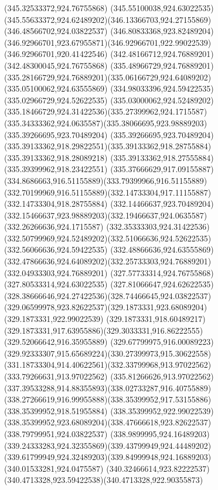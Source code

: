 {{		\lineto(345.32533372,924.76755868)
		\lineto(345.55100038,924.63022535)
		\curveto(345.55633372,924.62489202)(346.13366703,924.27155869)(346.48566702,924.03822537)
		\curveto(346.80833368,923.82489204)(346.92966701,923.67955871)(346.92966701,922.99022539)
		\lineto(346.92966701,920.41422546)
		\lineto(342.48166712,924.76889201)
		\lineto(342.48300045,924.76755868)
		\lineto(335.48966729,924.76889201)
		\curveto(335.28166729,924.76889201)(335.06166729,924.64089202)(335.05100062,924.63555869)
		\lineto(334.98033396,924.59422535)
		\lineto(335.02966729,924.52622535)
		\curveto(335.03000062,924.52489202)(335.18466729,924.31422536)(335.27399962,924.1715587)
		\curveto(335.34333362,924.0635587)(335.38066695,923.98889203)(335.39266695,923.70489204)
		\curveto(335.39266695,923.70489204)(335.39133362,918.29822551)(335.39133362,918.28755884)
		\lineto(335.39133362,918.28089218)
		\lineto(335.39133362,918.27555884)
		\lineto(335.39399962,918.23422551)
		\curveto(335.37666629,917.09155887)(334.8686663,916.51155889)(333.79399966,916.51155889)
		\curveto(332.70199969,916.51155889)(332.14733304,917.11155887)(332.14733304,918.28755884)
		\lineto(332.14466637,923.70489204)
		\curveto(332.15466637,923.98889203)(332.19466637,924.0635587)(332.26266636,924.1715587)
		\curveto(332.35333303,924.31422536)(332.50799969,924.52489202)(332.51066636,924.52622535)
		\lineto(332.56066636,924.59422535)
		\lineto(332.48866636,924.63555869)
		\curveto(332.47866636,924.64089202)(332.25733303,924.76889201)(332.04933303,924.76889201)
		\lineto(327.57733314,924.76755868)
		\lineto(327.80533314,924.63022535)
		\curveto(327.81066647,924.62622535)(328.38666646,924.27422536)(328.74466645,924.03822537)
		\curveto(329.06599978,923.82622537)(329.1873331,923.68089204)(329.1873331,922.99022539)
		\lineto(329.1873331,918.60489217)
		\curveto(329.1873331,917.63955886)(329.3033331,916.86222555)(329.52066642,916.35955889)
		\curveto(329.67799975,916.00089223)(329.92333307,915.65689224)(330.27399973,915.30622558)
		\curveto(331.18733304,914.40622561)(332.33799968,913.97022562)(333.79266631,913.97022562)
		\curveto(335.81266626,913.97022562)(337.39533288,914.88355893)(338.02733287,916.40755889)
		\curveto(338.27266619,916.99955888)(338.35399952,917.53155886)(338.35399952,918.51955884)
		\lineto(338.35399952,922.99022539)
		\curveto(338.35399952,923.68089204)(338.47666618,923.82622537)(338.79799951,924.03822537)
		\curveto(338.9899995,924.16489203)(339.24333283,924.32355869)(339.43799949,924.44489202)
		\curveto(339.61799949,924.32489203)(339.84999948,924.16889203)(340.01533281,924.0475587)
		\curveto(340.32466614,923.82222537)(340.4713328,923.59422538)(340.4713328,922.90355873)
}}
